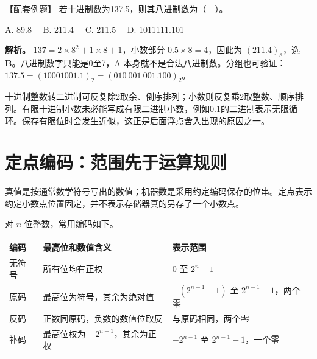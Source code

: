 \begin{example}[配套例题]

【配套例题】 若十进制数为137.5，则其八进制数为（　）。

A. 89.8　 B. 211.4　 C. 211.5　 D. 1011111.101

\end{example}

\textbf{解析。} \(137=2\times8^2+1\times8+1\)，小数部分 \(0.5\times8=4\)，因此为 \((211.4)_8\)，选 \textbf{B}。八进制数字只能是0至7，A 本身就不是合法八进制数。分组也可验证：\(137.5=(10001001.1)_2=(010\ 001\ 001.100)_2\)。

十进制整数转二进制可反复除2取余、倒序排列；小数则反复乘2取整数、顺序排列。有限十进制小数未必能写成有限二进制小数，例如0.1的二进制表示无限循环。保存有限位时会发生近似，这正是后面浮点舍入出现的原因之一。

\section{定点编码：范围先于运算规则}\label{CO02-04}

真值是按通常数学符号写出的数值；机器数是采用约定编码保存的位串。定点表示约定小数点位置固定，并不表示存储器真的另存了一个小数点。

对 \(n\) 位整数，常用编码如下。

\begin{wideblock}

\par\medskip\noindent\begin{minipage}{\linewidth}\fontsize{9.3}{12}\selectfont\begin{tabularx}{\linewidth}{@{}YYY@{}}
\toprule\noalign{}
\begin{minipage}[b]{\linewidth}\raggedright
编码
\end{minipage} & \begin{minipage}[b]{\linewidth}\raggedright
最高位和数值含义
\end{minipage} & \begin{minipage}[b]{\linewidth}\raggedright
表示范围
\end{minipage} \\
\midrule\noalign{}


无符号 & 所有位均有正权 & \(0\) 至 \(2^n-1\) \\
原码 & 最高位为符号，其余为绝对值 & \(-(2^{n-1}-1)\) 至 \(2^{n-1}-1\)，两个零 \\
反码 & 正数同原码，负数的数值位取反 & 与原码相同，两个零 \\
补码 & 最高位权为 \(-2^{n-1}\)，其余为正权 & \(-2^{n-1}\) 至 \(2^{n-1}-1\)，一个零 \\
\bottomrule\end{tabularx}
\end{minipage}\par\medskip

\end{wideblock}

